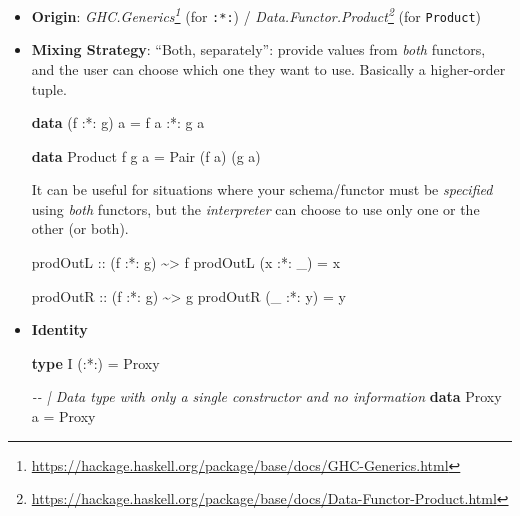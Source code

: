 \documentclass[]{article}
\newenvironment{Shaded}{}{}
\newcommand{\CommentTok}[1]{\textcolor[rgb]{0.38,0.63,0.69}{\textit{#1}}}
\newcommand{\DataTypeTok}[1]{\textcolor[rgb]{0.56,0.13,0.00}{#1}}
\newcommand{\KeywordTok}[1]{\textcolor[rgb]{0.00,0.44,0.13}{\textbf{#1}}}
\newcommand{\NormalTok}[1]{#1}
\newcommand{\OperatorTok}[1]{\textcolor[rgb]{0.40,0.40,0.40}{#1}}
\newcommand{\OtherTok}[1]{\textcolor[rgb]{0.00,0.44,0.13}{#1}}
\renewcommand{\href}[2]{#2\footnote{\url{#1}}}
\begin{document}
\begin{itemize}
\item
  \textbf{Origin}:
  \emph{\href{https://hackage.haskell.org/package/base/docs/GHC-Generics.html}{GHC.Generics}}
  (for \texttt{:*:}) /
  \emph{\href{https://hackage.haskell.org/package/base/docs/Data-Functor-Product.html}{Data.Functor.Product}}
  (for \texttt{Product})
\item
  \textbf{Mixing Strategy}: ``Both, separately'': provide values from
  \emph{both} functors, and the user can choose which one they want to use.
  Basically a higher-order tuple.

\begin{Shaded}
\begin{Highlighting}[]
\KeywordTok{data}\NormalTok{ (f }\OperatorTok{:*:}\NormalTok{ g) a }\OtherTok{=}\NormalTok{ f a }\OperatorTok{:*:}\NormalTok{ g a}

\KeywordTok{data} \DataTypeTok{Product}\NormalTok{ f g a }\OtherTok{=} \DataTypeTok{Pair}\NormalTok{ (f a) (g a)}
\end{Highlighting}
\end{Shaded}

  It can be useful for situations where your schema/functor must be
  \emph{specified} using \emph{both} functors, but the \emph{interpreter} can
  choose to use only one or the other (or both).

\begin{Shaded}
\begin{Highlighting}[]
\OtherTok{prodOutL ::}\NormalTok{ (f }\OperatorTok{:*:}\NormalTok{ g) }\OperatorTok{\textasciitilde{}>}\NormalTok{ f}
\NormalTok{prodOutL (x }\OperatorTok{:*:}\NormalTok{ \_) }\OtherTok{=}\NormalTok{ x}

\OtherTok{prodOutR ::}\NormalTok{ (f }\OperatorTok{:*:}\NormalTok{ g) }\OperatorTok{\textasciitilde{}>}\NormalTok{ g}
\NormalTok{prodOutR (\_ }\OperatorTok{:*:}\NormalTok{ y) }\OtherTok{=}\NormalTok{ y}
\end{Highlighting}
\end{Shaded}
\item
  \textbf{Identity}

\begin{Shaded}
\begin{Highlighting}[]
\KeywordTok{type} \DataTypeTok{I}\NormalTok{ (}\OperatorTok{:*:}\NormalTok{) }\OtherTok{=} \DataTypeTok{Proxy}

\CommentTok{{-}{-} | Data type with only a single constructor and no information}
\KeywordTok{data} \DataTypeTok{Proxy}\NormalTok{ a }\OtherTok{=} \DataTypeTok{Proxy}
\end{Highlighting}
\end{Shaded}


\end{itemize}
\end{document}
